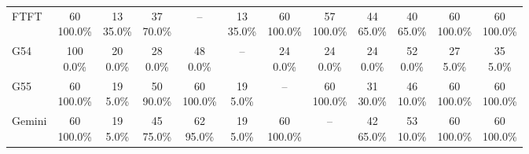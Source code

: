 \documentclass[11pt]{article}
\begin{document}
\begin{table}[H]
{\begin{tabular}{lccccccccccc}
FTFT & \shortstack{60\\100.0\%} & \shortstack{13\\35.0\%} & \shortstack{37\\70.0\%} & -- & \shortstack{13\\35.0\%} & \shortstack{60\\100.0\%} & \shortstack{57\\100.0\%} & \shortstack{44\\65.0\%} & \shortstack{40\\65.0\%} & \shortstack{60\\100.0\%} & \shortstack{60\\100.0\%} \\
G54 & \shortstack{100\\0.0\%} & \shortstack{20\\0.0\%} & \shortstack{28\\0.0\%} & \shortstack{48\\0.0\%} & -- & \shortstack{24\\0.0\%} & \shortstack{24\\0.0\%} & \shortstack{24\\0.0\%} & \shortstack{52\\0.0\%} & \shortstack{27\\5.0\%} & \shortstack{35\\5.0\%} \\
G55 & \shortstack{60\\100.0\%} & \shortstack{19\\5.0\%} & \shortstack{50\\90.0\%} & \shortstack{60\\100.0\%} & \shortstack{19\\5.0\%} & -- & \shortstack{60\\100.0\%} & \shortstack{31\\30.0\%} & \shortstack{46\\10.0\%} & \shortstack{60\\100.0\%} & \shortstack{60\\100.0\%} \\
Gemini & \shortstack{60\\100.0\%} & \shortstack{19\\5.0\%} & \shortstack{45\\75.0\%} & \shortstack{62\\95.0\%} & \shortstack{19\\5.0\%} & \shortstack{60\\100.0\%} & -- & \shortstack{42\\65.0\%} & \shortstack{53\\10.0\%} & \shortstack{60\\100.0\%} & \shortstack{60\\100.0\%} \\

\end{tabular}}
\end{table}
\end{document}
